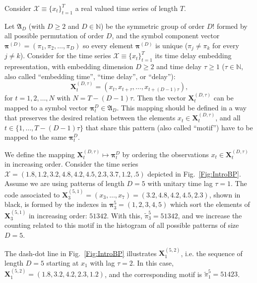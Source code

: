 \documentclass[journal]{IEEEtran}
\renewcommand{\Bbb}{\mathbb}
\begin{document}
Consider ${\mathcal X} \equiv \{x_t\}_{t=1}^{T}$ a real valued time series of length $T$. 

Let ${\mathfrak A}_{D}$ (with $D \geq 2$ and $D \in {\Bbb N}$) be the symmetric group of order $D!$ formed by all 
possible permutation of order $D$, and the symbol component vector 
${\bm \pi}^{(D)} = (\pi_1, \pi_2, \dots, \pi_D)$ so every element ${\bm \pi}^{(D)}$ is unique 
($\pi_j \neq \pi_k$ for every $j \neq k$). 
Consider for the time series ${\mathcal X} \equiv \{x_t\}_{t=1}^{T}$ its time delay embedding representation,
with embedding dimension $D \geq 2$ and time delay $\tau \geq 1$ ($\tau \in {\Bbb N}$, also called ``embedding time'', ``time delay'', or ``delay''):
\begin{equation} 
\label{eq:time-delay}
{\mathbf X}^{(D,\tau)}_t =( x_t,x_{t+\tau},\dots,x_{t+(D-1)\tau} ) ,
\end{equation} 
%
for $t = 1,2,\dots,N$ with $N = T-(D-1) \tau$.
Then the vector ${\mathbf X}^{(D,\tau)}_t$ can be mapped to a symbol vector ${\bm \pi}_t^D \in {\mathfrak A}_{D}$. 
This mapping should be defined in a way that preserves the desired relation between the elements 
$x_t  \in {\mathbf X}^{(D,\tau)}_t$, and all $t \in \{1,\dots,T-(D-1)\tau\}$ that share this pattern (also called ``motif'') have to be mapped to the same 
${\bm \pi}_t^{D}$.

We define the mapping ${\mathbf X}_t^{(D,\tau)} \mapsto {\mathbf \pi}_t^{D}$ by ordering the observations $x_t \in {\mathbf X}_t^{(D,\tau)}$ in increasing order.
Consider the time series $\mathcal X = (1.8, 1.2, 3.2, 4.8, 4.2, 4.5, 2.3, 3.7, 1.2, .5)$ depicted in Fig.~\ref{Fig:IntroBP}.
Assume we are using patterns of length $D=5$ with unitary time lag $\tau=1$.
The code associated to $\mathbf X_{3}^{(5,1)}=(x_3,\dots,x_7)=(3.2, 4.8, 4.2, 4.5, 2.3)$, shown in black, is formed by the indexes in $\bm\pi_3^{5}=(1,2,3,4,5)$ which sort the elements of $\mathbf X_{3}^{(5,1)}$ in increasing order: $51342$.
With this, $\widetilde{\pi}_3^{5} = 51342$, and we increase the counting related to this motif in the histogram of all possible patterns of size $D=5$.

The dash-dot line in Fig.~\ref{Fig:IntroBP} illustrates $\mathbf X_{1}^{(5,2)}$, i.e. the sequence of length $D=5$ starting at $x_1$ with lag $\tau=2$.
In this case, $\mathbf X_{1}^{(5,2)}= (1.8, 3.2, 4.2, 2.3, 1.2)$, and the corresponding motif is $\widetilde{\pi}_1^{5}=51423$.
\end{document}

